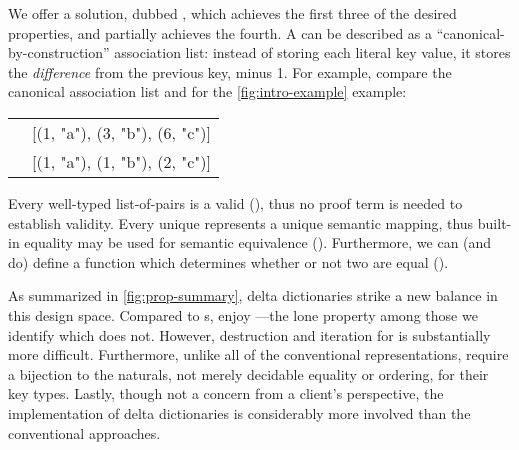 
%
We offer a solution, dubbed \emph{\dds{}}, which achieves the first three of the desired properties, and partially achieves the fourth.
%
%
A \dd{} can be described as a ``canonical-by-construction'' association list: instead of storing each literal key value, it stores the \emph{difference} from the previous key, minus 1.
%
For example, compare the canonical association list and \dd{} for the \autoref{fig:intro-example} example:

\vsepRule

\begin{tabular}{ l l }
 \Cal{} & [(1, "a"), (3, "b"), (6, "c")] \\
 \Dd{}  & [(1, "a"), (1, "b"), (2, "c")]
\end{tabular}

\vsepRule

Every well-typed list-of-pairs is a valid \dd{} (\SemTot), thus no proof term is needed to establish validity.
%
Every unique \dd{} represents a unique semantic mapping, thus built-in equality may be used for semantic equivalence (\SemInj).
%
%
Furthermore, we can (and do) define a function which determines whether or not two \dds{} are equal (\EqDec).

As summarized in \autoref{fig:prop-summary}, delta dictionaries strike a new balance in this design space.
%
Compared to \cal{}s, \dds{} enjoy \SemTot{}---the lone property among those we identify which \cal{} does not.
%
However, destruction and iteration for \dds{} is substantially more difficult.
%
Furthermore, unlike all of the conventional representations, \dds{} require a bijection to the naturals, not merely decidable equality or ordering, for their key types.
%
%
Lastly, though not a concern from a client's perspective, the implementation of delta dictionaries is considerably more involved than the conventional approaches.

